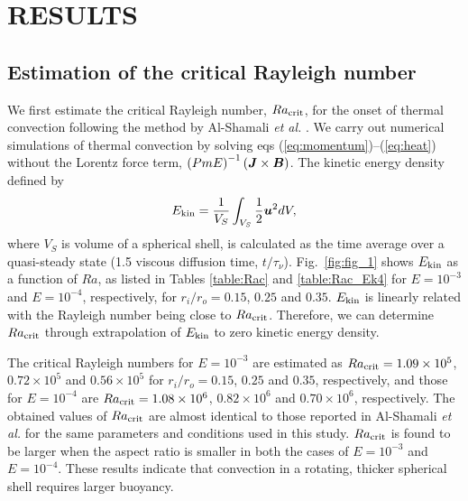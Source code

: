 \section{RESULTS}

\subsection{Estimation of the critical Rayleigh number}

We first estimate the critical Rayleigh number, $Ra_{\rm crit}$, for the onset of thermal convection following the method by Al-Shamali {\it et al.} .
We carry out numerical simulations of thermal convection by solving eqs (\ref{eq:momentum})--(\ref{eq:heat}) without the Lorentz force term, $\left(Pm E\right)^{-1} \left(\mbox{\boldmath$J$} \times \mbox{\boldmath$B$} \right)$.
The kinetic energy density defined by
%
\begin{equation}
E_{\rm kin} = \frac{1}{V_{S}} \int_{V_{S}} \frac{1}{2} \mbox{\boldmath$u$}^{2} dV,
\label{eq:kinetic_energy}
\end{equation}
%
where $V_{S}$ is volume of a spherical shell, is calculated as the time average over a quasi-steady state (1.5 viscous diffusion time, $t/\tau_\nu$).
Fig.~\ref{fig:fig_1} shows $E_{\rm kin}$ as a function of $Ra$, as listed in Tables \ref{table:Rac} and \ref{table:Rac_Ek4} for $E = 10^{-3}$ and $E = 10^{-4}$, respectively, for $r_i / r_o = 0.15$, $0.25$ and $0.35$.
$E_{\rm kin}$ is linearly related with the Rayleigh number being close to $Ra_{\rm crit}$.
Therefore, we can determine $Ra_{\rm crit}$ through extrapolation of $E_{\rm kin}$ to zero kinetic energy density.



The critical Rayleigh numbers 
for $E = 10^{-3}$
are estimated as $Ra_{\rm crit} = 1.09 \times 10^5$, $0.72 \times 10^5$ and $0.56 \times 10^5$ for $r_i/r_o = 0.15$, $0.25$ and $0.35$, respectively, 
and those for $E = 10^{-4}$ are $Ra_{\rm crit} = 1.08 \times 10^6$, $0.82 \times 10^6$ and $0.70 \times 10^6$, respectively.
The obtained values of $Ra_{\rm crit}$ are almost identical to those reported in Al-Shamali {\it et al.}  for the same parameters and conditions used in this study. 
$Ra_{\rm crit}$ is found to be larger when the aspect ratio is smaller in both the cases of $E = 10^{-3}$ and $E = 10^{-4}$. 
These results indicate that convection in a rotating, thicker spherical shell requires larger buoyancy.
%
%


